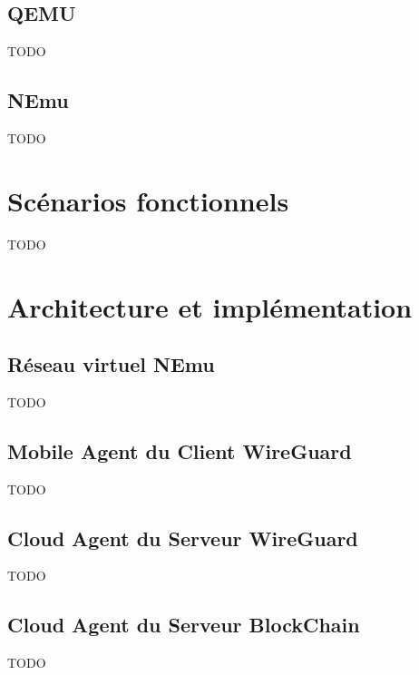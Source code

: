 \documentclass[12pt, openany]{report}
\begin{document}
\subsection{QEMU}
\noindent 
\begin{flushleft}
TODO
\end{flushleft}

\subsection{NEmu}
\noindent 
\begin{flushleft}
TODO
\end{flushleft}

\section{Scénarios fonctionnels}
\noindent 
\begin{flushleft}
TODO
\end{flushleft}

\section{Architecture et implémentation}

\subsection{Réseau virtuel NEmu}
\noindent 
\begin{flushleft}
TODO
\end{flushleft}

\subsection{Mobile Agent du Client WireGuard}
\noindent 
\begin{flushleft}
TODO
\end{flushleft}

\subsection{Cloud Agent du Serveur WireGuard}
\noindent 
\begin{flushleft}
TODO
\end{flushleft}

\subsection{Cloud Agent du Serveur BlockChain}
\noindent 
\begin{flushleft}
TODO
\end{flushleft}
\end{document}
